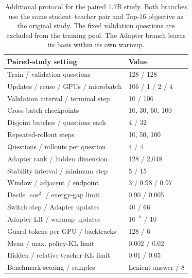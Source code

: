 \begin{table}[!htbp]
\centering
\caption{Additional protocol for the paired 1.7B study. Both branches use the same student--teacher pair and Top-16 objective as the original study. The fixed validation questions are excluded from the training pool. The Adapter branch learns its basis within its own warmup.}
\label{tab:paired_settings}
\small
\setlength{\tabcolsep}{3pt}
\begin{tabular}{ll}
\toprule
Paired-study setting & Value \\
\midrule
Train / validation questions & 128 / 128 \\
Updates / reuse / GPUs / microbatch & 106 / 1 / 2 / 4 \\
Validation interval / terminal step & 10 / 106 \\
Cross-batch checkpoints & 10, 30, 60, 100 \\
Disjoint batches / questions each & 4 / 32 \\
Repeated-rollout steps & 10, 50, 100 \\
Questions / rollouts per question & 4 / 4 \\
Adapter rank / hidden dimension & 128 / 2,048 \\
Stability interval / minimum step & 5 / 15 \\
Window / adjacent / endpoint & 3 / 0.98 / 0.97 \\
Decile $\cos^2$ / energy-gap limit & 0.90 / 0.005 \\
Switch step / Adapter updates & 40 / 66 \\
Adapter LR / warmup updates & $10^{-5}$ / 10 \\
Guard tokens per GPU / backtracks & 128 / 6 \\
Mean / max. policy-KL limit & 0.002 / 0.02 \\
Hidden / relative teacher-KL limit & 0.01 / 0.05 \\
Benchmark scoring / samples & Lenient answer / 8 \\
\bottomrule
\end{tabular}
\end{table}
